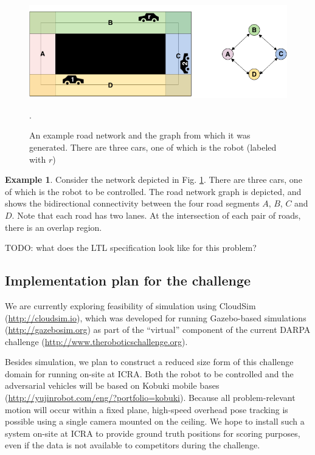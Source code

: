 \documentclass{amsart}
\theoremstyle{definition}
\newtheorem{example}{Example}[section]
\begin{document}
\begin{figure}[h!]\label{fig:network}
  \centering
        \includegraphics[width=1.0\textwidth]{images/network}
  \caption{An example road network and the graph from which it was generated. There are three cars, one of which is the robot (labeled with $r$)}.
\end{figure}

\begin{example}
Consider the network depicted in Fig. \ref{fig:network}. There are three cars,
one of which is the robot to be controlled. The road network graph is depicted,
and shows the bidirectional connectivity between the four road segments $A$,
$B$, $C$ and $D$. Note that each road has two lanes. At the intersection of each
pair of roads, there is an overlap region.
\end{example}

TODO: what does the LTL specification look like for this problem?

\subsection{Implementation plan for the challenge}

We are currently exploring feasibility of simulation using CloudSim
(\url{http://cloudsim.io}), which was developed for running Gazebo-based
simulations (\url{http://gazebosim.org}) as part of the ``virtual'' component of
the current DARPA challenge (\url{http://www.theroboticschallenge.org}).

Besides simulation, we plan to construct a reduced size form of this challenge
domain for running on-site at ICRA.  Both the robot to be controlled and the
adversarial vehicles will be based on Kobuki mobile bases
(\url{http://yujinrobot.com/eng/?portfolio=kobuki}).  Because all
problem-relevant motion will occur within a fixed plane, high-speed overhead
pose tracking is possible using a single camera mounted on the ceiling.  We hope
to install such a system on-site at ICRA to provide ground truth positions for
scoring purposes, even if the data is not available to competitors during the
challenge.
\end{document}
